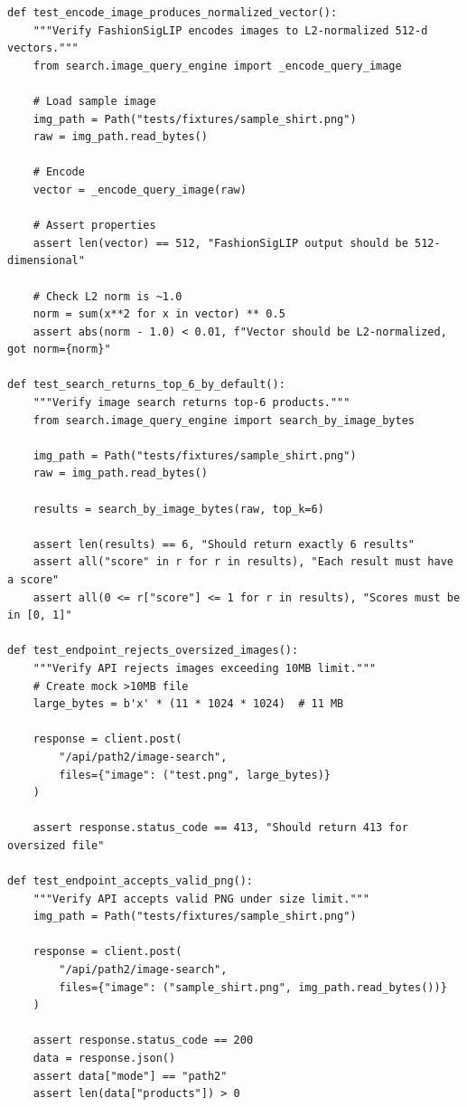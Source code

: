 \begin{lstlisting}[caption={PATH 2 Test Suite --- tests/test\_image\_search.py}]
def test_encode_image_produces_normalized_vector():
    """Verify FashionSigLIP encodes images to L2-normalized 512-d vectors."""
    from search.image_query_engine import _encode_query_image
    
    # Load sample image
    img_path = Path("tests/fixtures/sample_shirt.png")
    raw = img_path.read_bytes()
    
    # Encode
    vector = _encode_query_image(raw)
    
    # Assert properties
    assert len(vector) == 512, "FashionSigLIP output should be 512-dimensional"
    
    # Check L2 norm is ~1.0
    norm = sum(x**2 for x in vector) ** 0.5
    assert abs(norm - 1.0) < 0.01, f"Vector should be L2-normalized, got norm={norm}"

def test_search_returns_top_6_by_default():
    """Verify image search returns top-6 products."""
    from search.image_query_engine import search_by_image_bytes
    
    img_path = Path("tests/fixtures/sample_shirt.png")
    raw = img_path.read_bytes()
    
    results = search_by_image_bytes(raw, top_k=6)
    
    assert len(results) == 6, "Should return exactly 6 results"
    assert all("score" in r for r in results), "Each result must have a score"
    assert all(0 <= r["score"] <= 1 for r in results), "Scores must be in [0, 1]"

def test_endpoint_rejects_oversized_images():
    """Verify API rejects images exceeding 10MB limit."""
    # Create mock >10MB file
    large_bytes = b'x' * (11 * 1024 * 1024)  # 11 MB
    
    response = client.post(
        "/api/path2/image-search",
        files={"image": ("test.png", large_bytes)}
    )
    
    assert response.status_code == 413, "Should return 413 for oversized file"

def test_endpoint_accepts_valid_png():
    """Verify API accepts valid PNG under size limit."""
    img_path = Path("tests/fixtures/sample_shirt.png")
    
    response = client.post(
        "/api/path2/image-search",
        files={"image": ("sample_shirt.png", img_path.read_bytes())}
    )
    
    assert response.status_code == 200
    data = response.json()
    assert data["mode"] == "path2"
    assert len(data["products"]) > 0
\end{lstlisting}

